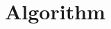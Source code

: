 \documentclass[sigconf]{acmart}
\newcommand{\CRIM}{\textsc{CRIM}}
\newcommand{\I}{\mathbb{I}}
\begin{document}





\section{Algorithm}
\label{sec:algo}
\end{document}
